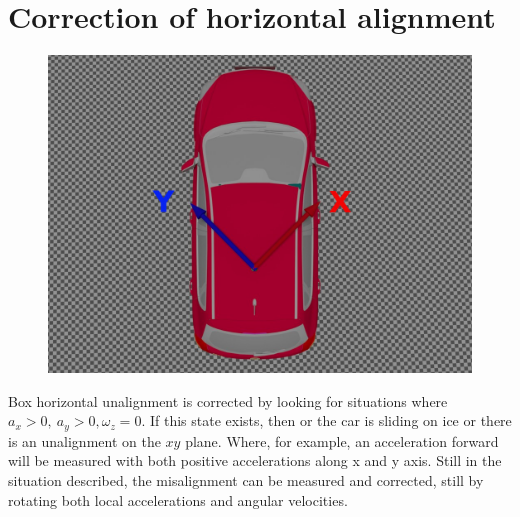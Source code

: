 \section{Correction of horizontal alignment}
\begin{figure}[H]
\includegraphics[width=\textwidth]{kia_bad_xy_align.jpg}
\end{figure}
\justify
Box horizontal unalignment is corrected by looking for situations where $a_x>0, \ a_y>0, \omega_z =0$. If this state exists, then or the car is sliding on ice or there is an unalignment on the $xy$ plane. Where, for example, an acceleration forward will be measured with both positive accelerations along x and y axis. 
Still in the situation described, the misalignment can be measured and corrected, still by rotating both local accelerations and angular velocities.


